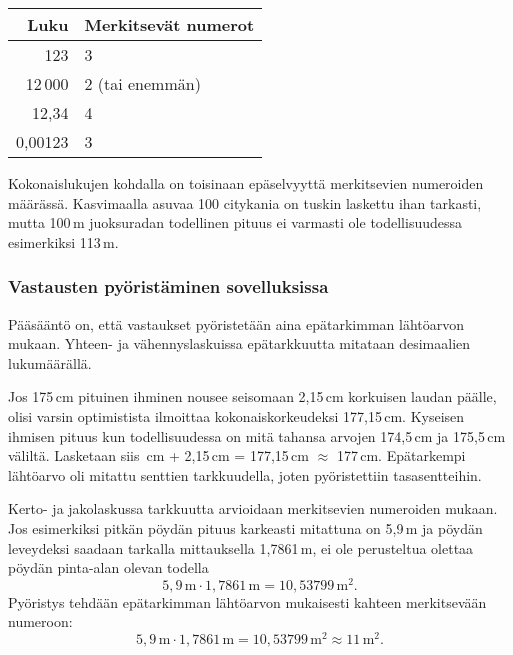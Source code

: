 \begin{center}
\begin{tabular}{r|l}
Luku & Merkitsevät numerot \\
\hline
123 & 3 \\
12\,000 & 2 (tai enemmän)\\
12,34 & 4 \\
0,00123 & 3
\end{tabular}
\end{center}


Kokonaislukujen kohdalla on toisinaan epäselvyyttä merkitsevien numeroiden määrässä. Kasvimaalla asuvaa 100 citykania on tuskin laskettu ihan tarkasti, mutta 100\,m juoksuradan todellinen pituus ei varmasti ole todellisuudessa esimerkiksi 113\,m.

\subsubsection*{Vastausten pyöristäminen sovelluksissa}

Pääsääntö on, että vastaukset pyöristetään aina epätarkimman lähtöarvon mukaan. Yhteen- ja vähennyslaskuissa epätarkkuutta mitataan desimaalien lukumäärällä.

\begin{esimerkki} Jos 175\,cm pituinen ihminen nousee seisomaan 2,15\,cm korkuisen laudan päälle, olisi varsin optimistista ilmoittaa kokonaiskorkeudeksi 177,15\,cm. Kyseisen ihmisen pituus kun todellisuudessa on mitä tahansa arvojen
174,5\,cm ja 175,5\,cm väliltä. Lasketaan siis \,cm + 2,15\,cm = 177,15\,cm $\approx$ 177\,cm. 
Epätarkempi lähtöarvo oli mitattu senttien tarkkuudella, joten pyöristettiin tasasentteihin.
\end{esimerkki}

Kerto- ja jakolaskussa tarkkuutta arvioidaan merkitsevien numeroiden mukaan. Jos esimerkiksi pitkän pöydän pituus karkeasti mitattuna on 5,9\,m ja pöydän leveydeksi saadaan tarkalla mittauksella 1,7861\,m, ei ole perusteltua olettaa pöydän pinta-alan olevan todella
\[ 5,9\,\textrm{m} \cdot 1,7861\,\textrm{m} = 10,53799\,\textrm{m}^2. \] 
Pyöristys tehdään epätarkimman lähtöarvon mukaisesti kahteen merkitsevään numeroon:
\[ 5,9\,\textrm{m} \cdot 1,7861\,\textrm{m} = 10,53799\,\textrm{m}^2 \approx 11\,\textrm{m}^2.\] 

